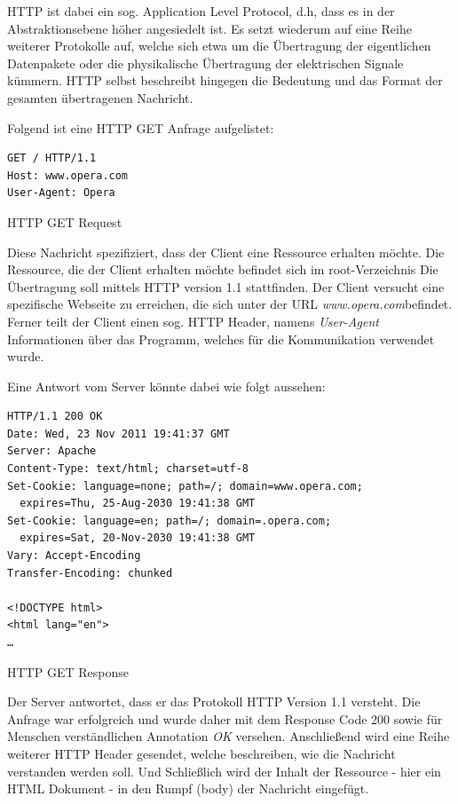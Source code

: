 HTTP ist dabei ein sog. Application Level Protocol, d.h, dass es in der Abstraktionsebene höher angesiedelt ist. Es setzt wiederum auf eine Reihe weiterer Protokolle auf, welche sich etwa um die Übertragung der eigentlichen Datenpakete oder die physikalische Übertragung der elektrischen Signale kümmern. HTTP selbst beschreibt hingegen die Bedeutung und das Format der gesamten übertragenen Nachricht.

Folgend ist eine HTTP GET Anfrage aufgelistet:

\begin{listing}[H]
\begin{verbatim}
GET / HTTP/1.1
Host: www.opera.com
User-Agent: Opera
\end{verbatim}
\caption{HTTP GET Request}
\end{listing}

Diese Nachricht spezifiziert, dass der Client eine Ressource erhalten möchte.
Die Ressource, die der Client erhalten möchte befindet sich im root-Verzeichnis
Die Übertragung soll mittels HTTP version 1.1 stattfinden. Der Client versucht eine spezifische Webseite zu erreichen, die sich unter der URL \emph{www.opera.com}befindet. Ferner teilt der Client einen sog. HTTP Header, namens \emph{User-Agent} Informationen über das Programm, welches für die Kommunikation verwendet wurde.

Eine Antwort vom Server könnte dabei wie folgt aussehen:

\begin{listing}[H]
\begin{verbatim}
HTTP/1.1 200 OK
Date: Wed, 23 Nov 2011 19:41:37 GMT
Server: Apache
Content-Type: text/html; charset=utf-8
Set-Cookie: language=none; path=/; domain=www.opera.com; 
  expires=Thu, 25-Aug-2030 19:41:38 GMT
Set-Cookie: language=en; path=/; domain=.opera.com; 
  expires=Sat, 20-Nov-2030 19:41:38 GMT
Vary: Accept-Encoding
Transfer-Encoding: chunked

<!DOCTYPE html>
<html lang="en">
…
\end{verbatim}
\caption{HTTP GET Response}
\end{listing}

Der Server antwortet, dass er das Protokoll HTTP Version 1.1 versteht. Die Anfrage war erfolgreich und wurde daher mit dem Response Code 200 sowie für Menschen verständlichen Annotation \textit{OK} versehen. Anschließend wird eine Reihe weiterer HTTP Header gesendet, welche beschreiben, wie die Nachricht verstanden werden soll. Und Schließlich wird der Inhalt der Ressource - hier ein HTML Dokument - in den Rumpf (body) der Nachricht eingefügt.

